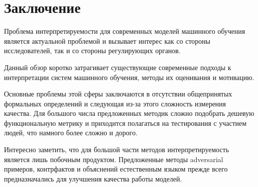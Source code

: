 \chapter{Заключение}


Проблема интерпретируемости для современных моделей машинного обучения является актуальной проблемой и вызывает интерес как со стороны исследователей, так и со стороны регулирующих органов.

Данный обзор коротко затрагивает существующие современные подходы к интерпретации систем машинного обучения, методы их оценивания и мотивацию.

Основные проблемы этой сферы заключаются в отсутствии общепринятых формальных определений и следующая из-за этого сложность измерения качества. Для большого числа предложенных методик сложно подобрать дешевую функциональную метрику и приходится полагаться на тестирования с участием людей, что намного более сложно и дорого.


Интересно заметить, что для большой части методов интерпретируемость является лишь побочным продуктом. Предложенные методы adversarial примеров, контрфактов и объяснений естественным языком прежде всего предназначались для улучшения качества работы моделей. 